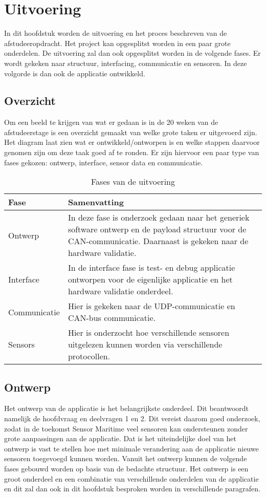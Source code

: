 \chapter{Uitvoering}
In dit hoofdstuk worden de uitvoering en het proces beschreven van de afstudeeropdracht. Het project kan opgesplitst worden in een paar grote onderdelen. De uitvoering zal dan ook opgesplitst worden in de volgende fases. Er wordt gekeken naar structuur, interfacing, communicatie en sensoren. In deze volgorde is dan ook de applicatie ontwikkeld.

\section{Overzicht}
Om een beeld te krijgen van wat er gedaan is in de 20 weken van de afstudeerstage is een overzicht gemaakt van welke grote taken er uitgevoerd zijn. Het diagram laat zien wat er ontwikkeld/ontworpen is en welke stappen daarvoor genomen zijn om deze taak goed af te ronden. Er zijn hiervoor een paar type van fases gekozen: ontwerp, interface, sensor data en communicatie.

\begin{table}[h!]
	\centering
	\caption{Fases van de uitvoering}
	\label{tab:UitvoeringOverzicht}
	\begin{tabular}{lp{13cm}}
	\toprule
	\textbf{Fase} & \textbf{Samenvatting} \\ \midrule
	Ontwerp 				& In deze fase is onderzoek gedaan naar het generiek software ontwerp en de payload structuur voor de CAN-communicatie. Daarnaast is gekeken naar de hardware validatie. \\
	Interface 				& In de interface fase is test- en debug applicatie ontworpen voor de eigenlijke applicatie en het hardware validatie onderdeel. 	\\
	Communicatie 			& Hier is gekeken naar de UDP-communicatie en CAN-bus communicatie.												\\
	Sensors  				& Hier is onderzocht hoe verschillende sensoren uitgelezen kunnen worden via verschillende protocollen.			\\ \bottomrule
	\end{tabular}
\end{table}

\newpage
\section{Ontwerp}
Het ontwerp van de applicatie is het belangrijkste onderdeel. Dit beantwoordt namelijk de hoofdvraag en deelvragen 1 en 2. Dit vereist daarom goed onderzoek, zodat in de toekomst Sensor Maritime veel sensoren kan ondersteunen zonder grote aanpassingen aan de applicatie. Dat is het uiteindelijke doel van het ontwerp is vast te stellen hoe met minimale verandering aan de applicatie nieuwe sensoren toegevoegd kunnen worden. Vanuit het ontwerp kunnen de volgende fases gebouwd worden op basis van de bedachte structuur. Het ontwerp is een groot onderdeel en een combinatie van verschillende onderdelen van de applicatie en dit zal dan ook in dit hoofdstuk besproken worden in verschillende paragrafen.

